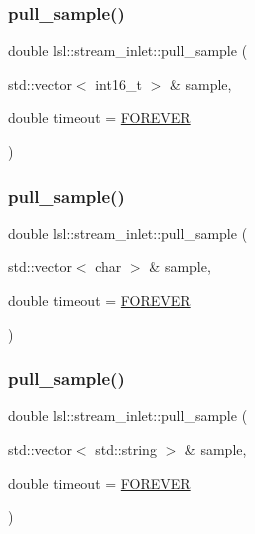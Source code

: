 \subsubsection{\texorpdfstring{pull\+\_\+sample()}{pull\_sample()}\hspace{0.1cm}{\footnotesize\ttfamily [6/15]}}
{\footnotesize\ttfamily double lsl\+::stream\+\_\+inlet\+::pull\+\_\+sample (\begin{DoxyParamCaption}\item[{std\+::vector$<$ int16\+\_\+t $>$ \&}]{sample,  }\item[{double}]{timeout = {\ttfamily \hyperlink{namespacelsl_a74cfbc9077aca21295117217249721ed}{F\+O\+R\+E\+V\+ER}} }\end{DoxyParamCaption})\hspace{0.3cm}{\ttfamily [inline]}}

\mbox{\label{classlsl_1_1stream__inlet_a3a2a662e0b723d7f2101b79eb08371b7}} 
\subsubsection{\texorpdfstring{pull\+\_\+sample()}{pull\_sample()}\hspace{0.1cm}{\footnotesize\ttfamily [7/15]}}
{\footnotesize\ttfamily double lsl\+::stream\+\_\+inlet\+::pull\+\_\+sample (\begin{DoxyParamCaption}\item[{std\+::vector$<$ char $>$ \&}]{sample,  }\item[{double}]{timeout = {\ttfamily \hyperlink{namespacelsl_a74cfbc9077aca21295117217249721ed}{F\+O\+R\+E\+V\+ER}} }\end{DoxyParamCaption})\hspace{0.3cm}{\ttfamily [inline]}}

\mbox{\label{classlsl_1_1stream__inlet_a78a36bf33ddfc7101bd15cb5bcb9561d}} 
\subsubsection{\texorpdfstring{pull\+\_\+sample()}{pull\_sample()}\hspace{0.1cm}{\footnotesize\ttfamily [8/15]}}
{\footnotesize\ttfamily double lsl\+::stream\+\_\+inlet\+::pull\+\_\+sample (\begin{DoxyParamCaption}\item[{std\+::vector$<$ std\+::string $>$ \&}]{sample,  }\item[{double}]{timeout = {\ttfamily \hyperlink{namespacelsl_a74cfbc9077aca21295117217249721ed}{F\+O\+R\+E\+V\+ER}} }\end{DoxyParamCaption})\hspace{0.3cm}{\ttfamily [inline]}}

